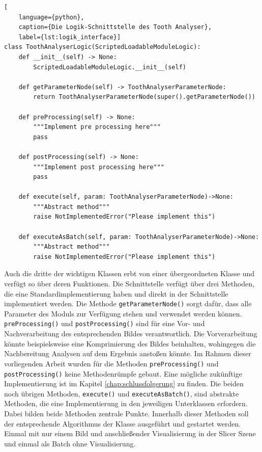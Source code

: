 \pagebreak

\begin{lstlisting}[
    language={python},
    caption={Die Logik-Schnittstelle des Tooth Analyser},
    label={lst:logik_interface}]
class ToothAnalyserLogic(ScriptedLoadableModuleLogic):
    def __init__(self) -> None:
        ScriptedLoadableModuleLogic.__init__(self)

    def getParameterNode(self) -> ToothAnalyserParameterNode:
        return ToothAnalyserParameterNode(super().getParameterNode())

    def preProcessing(self) -> None:
        """Implement pre processing here"""
        pass

    def postProcessing(self) -> None:
        """Implement post processing here"""
        pass

    def execute(self, param: ToothAnalyserParameterNode)->None:
        """Abstract method"""
        raise NotImplementedError("Please implement this")

    def executeAsBatch(self, param: ToothAnalyserParameterNode)->None:
        """Abstract method"""
        raise NotImplementedError("Please implement this")
\end{lstlisting}

Auch die dritte der wichtigen Klassen erbt von einer übergeordneten Klasse und verfügt
so über deren Funktionen. Die Schnittstelle verfügt über drei Methoden, die eine
Standardimplementierung haben und direkt in der Schnittstelle implementiert werden.
Die Methode \texttt{getParameterNode()} sorgt dafür, dass alle Parameter des
Moduls zur Verfügung stehen und verwendet werden können. \texttt{preProcessing()}
und \texttt{postProcessing()} sind für eine Vor- und Nachverarbeitung des
entsprechenden Bildes verantwortlich. Die Vorverarbeitung könnte beispielsweise eine
Komprimierung des Bildes beinhalten, wohingegen die Nachbereitung Analysen auf
dem Ergebnis anstoßen könnte. Im Rahmen dieser vorliegenden Arbeit wurden für die
Methoden \texttt{preProcessing()} und \texttt{postProcessing()} keine Methodenrümpfe
gebaut. Eine mögliche zukünftige Implementierung ist im Kapitel
\ref{chap:schlussfolgerung} zu finden. Die beiden noch übrigen Methoden, \texttt{execute()}
und \texttt{executeAsBatch()}, sind abstrakte Methoden, die eine Implementierung
in den jeweiligen Unterklassen erfordern. Dabei bilden beide Methoden zentrale Punkte.
Innerhalb dieser Methoden soll der entsprechende Algorithmus der Klasse
ausgeführt und gestartet werden. Einmal mit nur einem Bild und anschließender Visualisierung
in der Slicer Szene und einmal als Batch ohne Visualisierung.

